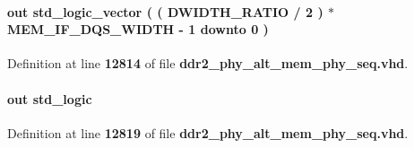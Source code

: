 \paragraph[{seq\+\_\+wdp\+\_\+dqs\+\_\+burst}]{ {\bfseries \textcolor{keywordflow}{out}\textcolor{vhdlchar}{ }} {\bfseries \textcolor{comment}{std\+\_\+logic\+\_\+vector}\textcolor{vhdlchar}{ }\textcolor{vhdlchar}{(}\textcolor{vhdlchar}{ }\textcolor{vhdlchar}{(}\textcolor{vhdlchar}{ }\textcolor{vhdlchar}{ }\textcolor{vhdlchar}{ }\textcolor{vhdlchar}{ }{\bfseries {\bf D\+W\+I\+D\+T\+H\+\_\+\+R\+A\+T\+IO}} \textcolor{vhdlchar}{/}\textcolor{vhdlchar}{ } \textcolor{vhdldigit}{2} \textcolor{vhdlchar}{ }\textcolor{vhdlchar}{)}\textcolor{vhdlchar}{ }\textcolor{vhdlchar}{$\ast$}\textcolor{vhdlchar}{ }\textcolor{vhdlchar}{ }\textcolor{vhdlchar}{ }{\bfseries {\bf M\+E\+M\+\_\+\+I\+F\+\_\+\+D\+Q\+S\+\_\+\+W\+I\+D\+TH}} \textcolor{vhdlchar}{-\/}\textcolor{vhdlchar}{ } \textcolor{vhdldigit}{1} \textcolor{vhdlchar}{ }\textcolor{keywordflow}{downto}\textcolor{vhdlchar}{ }\textcolor{vhdlchar}{ } \textcolor{vhdldigit}{0} \textcolor{vhdlchar}{ }\textcolor{vhdlchar}{)}\textcolor{vhdlchar}{ }} \hspace{0.3cm}{\ttfamily [Port]}}\label{classddr2__phy__alt__mem__phy__seq_a393678f0c339e1ea7b9ace1763053183}


Definition at line {\bf 12814} of file {\bf ddr2\+\_\+phy\+\_\+alt\+\_\+mem\+\_\+phy\+\_\+seq.\+vhd}.

\paragraph[{seq\+\_\+wdp\+\_\+ovride}]{ {\bfseries \textcolor{keywordflow}{out}\textcolor{vhdlchar}{ }} {\bfseries \textcolor{comment}{std\+\_\+logic}\textcolor{vhdlchar}{ }} \hspace{0.3cm}{\ttfamily [Port]}}\label{classddr2__phy__alt__mem__phy__seq_a3822efd1ce73771b3d5ffcf6a1ea2bc8}


Definition at line {\bf 12819} of file {\bf ddr2\+\_\+phy\+\_\+alt\+\_\+mem\+\_\+phy\+\_\+seq.\+vhd}.

